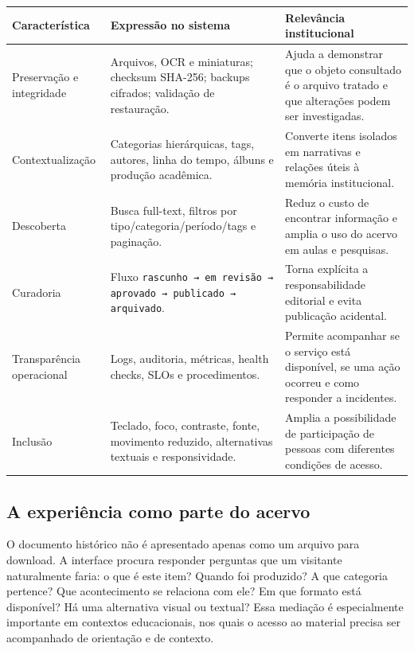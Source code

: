 \documentclass[11pt,a4paper]{article}
\newcommand{\code}[1]{\texttt{#1}}
\begin{document}
\begin{longtable}{P{0.23\textwidth}P{0.39\textwidth}P{0.30\textwidth}}
\toprule
\textbf{Característica} & \textbf{Expressão no sistema} & \textbf{Relevância institucional} \\
\midrule
\endhead
\bottomrule
\endfoot
Preservação e integridade & Arquivos, OCR e miniaturas; checksum SHA-256; backups cifrados; validação de restauração. & Ajuda a demonstrar que o objeto consultado é o arquivo tratado e que alterações podem ser investigadas. \\
Contextualização & Categorias hierárquicas, tags, autores, linha do tempo, álbuns e produção acadêmica. & Converte itens isolados em narrativas e relações úteis à memória institucional. \\
Descoberta & Busca full-text, filtros por tipo/categoria/período/tags e paginação. & Reduz o custo de encontrar informação e amplia o uso do acervo em aulas e pesquisas. \\
Curadoria & Fluxo \code{rascunho → em revisão → aprovado → publicado → arquivado}. & Torna explícita a responsabilidade editorial e evita publicação acidental. \\
Transparência operacional & Logs, auditoria, métricas, health checks, SLOs e procedimentos. & Permite acompanhar se o serviço está disponível, se uma ação ocorreu e como responder a incidentes. \\
Inclusão & Teclado, foco, contraste, fonte, movimento reduzido, alternativas textuais e responsividade. & Amplia a possibilidade de participação de pessoas com diferentes condições de acesso. \\
\end{longtable}

\subsection{A experiência como parte do acervo}

O documento histórico não é apresentado apenas como um arquivo para download. A interface procura responder perguntas que um visitante naturalmente faria: o que é este item? Quando foi produzido? A que categoria pertence? Que acontecimento se relaciona com ele? Em que formato está disponível? Há uma alternativa visual ou textual? Essa mediação é especialmente importante em contextos educacionais, nos quais o acesso ao material precisa ser acompanhado de orientação e de contexto.

\end{document}
